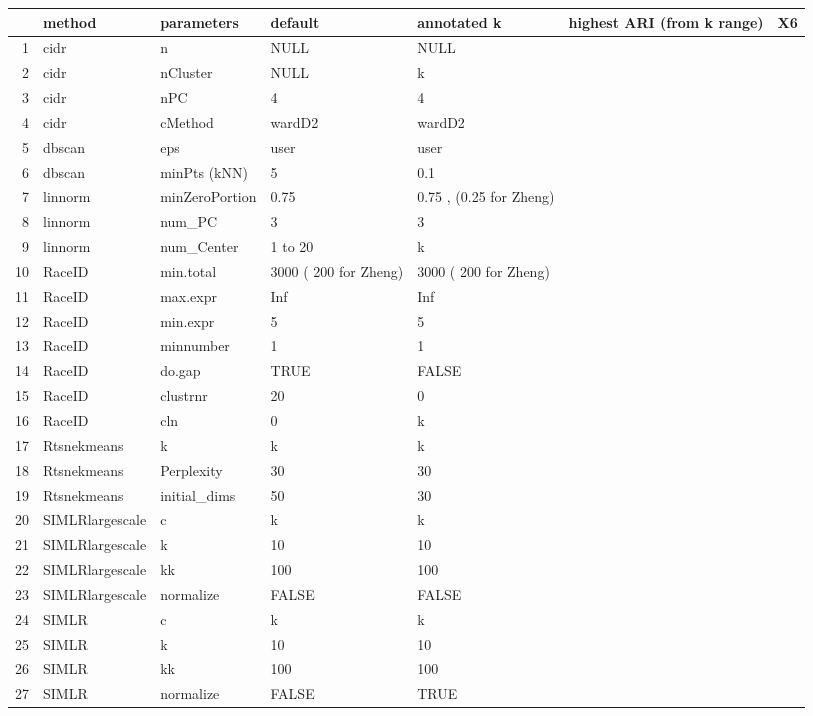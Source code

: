 \documentclass[12pt, a4paper]{article}\usepackage[]{graphicx}\usepackage[]{color}
\begin{document}
\clearpage
\begin{table}[ht]
\centering
\begin{tabular}{rllllll}
  \hline
 & method & parameters & default & annotated k & highest ARI (from k range) & X6 \\ 
  \hline
1 & cidr & n & NULL & NULL &  &  \\ 
  2 & cidr & nCluster & NULL & k &  &  \\ 
  3 & cidr & nPC & 4 & 4 &  &  \\ 
  4 & cidr & cMethod & wardD2 & wardD2 &  &  \\ 
  5 & dbscan & eps & user & user &  &  \\ 
  6 & dbscan & minPts (kNN) & 5 & 0.1 &  &  \\ 
  7 & linnorm & minZeroPortion & 0.75 & 0.75 , (0.25 for Zheng) &  &  \\ 
  8 & linnorm & num\_PC & 3 & 3 &  &  \\ 
  9 & linnorm & num\_Center & 1 to 20 & k &  &  \\ 
  10 & RaceID & min.total & 3000 ( 200 for Zheng) & 3000 ( 200 for Zheng) &  &  \\ 
  11 & RaceID & max.expr & Inf & Inf &  &  \\ 
  12 & RaceID & min.expr & 5 & 5 &  &  \\ 
  13 & RaceID & minnumber & 1 & 1 &  &  \\ 
  14 & RaceID & do.gap & TRUE & FALSE &  &  \\ 
  15 & RaceID & clustrnr & 20 & 0 &  &  \\ 
  16 & RaceID & cln & 0 & k &  &  \\ 
  17 & Rtsnekmeans & k & k & k &  &  \\ 
  18 & Rtsnekmeans & Perplexity & 30 & 30 &  &  \\ 
  19 & Rtsnekmeans & initial\_dims & 50 & 30 &  &  \\ 
  20 & SIMLRlargescale & c & k & k &  &  \\ 
  21 & SIMLRlargescale & k & 10 & 10 &  &  \\ 
  22 & SIMLRlargescale & kk & 100 & 100 &  &  \\ 
  23 & SIMLRlargescale & normalize & FALSE & FALSE &  &  \\ 
  24 & SIMLR & c & k & k &  &  \\ 
  25 & SIMLR & k & 10 & 10 &  &  \\ 
  26 & SIMLR & kk & 100 & 100 &  &  \\ 
  27 & SIMLR & normalize & FALSE & TRUE &  &  \\ 

\end{tabular}
\end{table}
\end{document}
